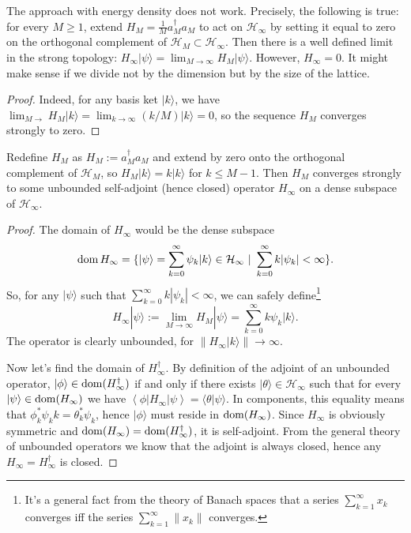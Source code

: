 	\begin{statement}
	The approach with energy density does not work. Precisely, the following is true: for every $M \geq 1$, extend $H_M = \frac{1}{M} a_M^\dagger a_M$ to act on $\mathcal{H}_\infty$ by setting it equal to zero on the orthogonal complement of $\mathcal H_{M} \subset \mathcal H_{\infty}$. Then there is a well defined limit in the strong topology: $H_{\infty}|\psi \rangle = \lim_{M \rightarrow \infty} H_{M}|\psi \rangle$. However, $H_{\infty} = 0$. It might make sense if we divide not by the dimension but by the size of the lattice.
	\end{statement}
	\begin{proof}
	Indeed, for any basis ket $|k\rangle$, we have $\lim_{M \rightarrow} H_M|k\rangle = \lim_{k \rightarrow \infty}(k/M)|k\rangle = 0$, so the sequence $H_M$ converges strongly to zero.
	\end{proof}
	\begin{statement}
	Redefine $H_M$ as $H_M := a_M^\dagger a_M$ and extend by zero onto the orthogonal complement of $\mathcal H_{M}$, so $H_M |k \rangle = k |k\rangle$ for $k \leq M-1$. Then $H_M$ converges strongly to some unbounded self-adjoint (hence closed) operator $H_{\infty}$ on a dense subspace of $\mathcal H_{\infty}$.
	\end{statement}
	\begin{proof}
The domain of $H_{\infty}$ would be the dense subspace
\[
\operatorname{dom} H_{\infty} = \{ |\psi\rangle = \sum_{k=0}^\infty \psi_k |k \rangle \in \mathcal H_{\infty} \ | \ \sum_{k=0}^\infty k |\psi_k| < \infty \}.
\]
So, for any $|\psi\rangle$ such that $\sum_{k=0}^\infty k |\psi_k| < \infty$, we can safely define\footnote{It's a general fact from the theory of Banach spaces that a series $\sum_{k=1}^\infty x_k$ converges iff the series $\sum_{k=1}^\infty \|x_k\|$ converges.}
\[
H_{\infty}|\psi \rangle :=\lim_{M \rightarrow \infty} H_{M}|\psi \rangle = \sum_{k=0}^\infty k\psi_k |k \rangle.
\]
The operator is clearly unbounded, for $\|H_{\infty}|k\rangle\| \rightarrow \infty$.

Now let's find the domain of $H_{\infty}^\dagger$. By definition of the adjoint of an unbounded operator, $|\phi \rangle \in \operatorname{dom} (H_{\infty}^\dagger)$ if and only if there exists $|\theta\rangle \in \mathcal H_{\infty}$ such that for every $|\psi \rangle \in \operatorname{dom}(H_{\infty})$ we have $\left\langle \phi | H_{\infty} | \psi \right\rangle = \langle \theta | \psi \rangle$. In components, this equality means that $\phi_k^* \psi_k k = \theta_k^* \psi_k$, hence $|\phi\rangle$ must reside in $\operatorname{dom}(H_\infty)$. Since $H_{\infty}$ is obviously symmetric and $\operatorname{dom}(H_{\infty}) = \operatorname{dom}(H_{\infty}^\dagger)$, it is self-adjoint. From the general theory of unbounded operators we know that the adjoint is always closed, hence any $H_{\infty} = H_{\infty}^\dagger$ is closed.
	\end{proof}
	

